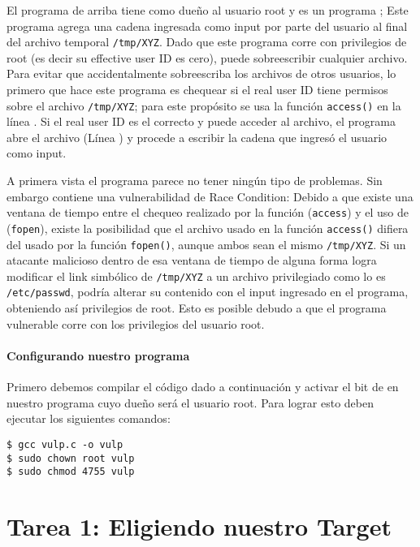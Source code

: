 El programa de arriba tiene como dueño al usuario root y es un programa \setuid; Este programa agrega una cadena ingresada como input por parte del usuario al final del archivo temporal {\tt /tmp/XYZ}. Dado que este programa corre con privilegios de root (es decir su effective user ID es cero), puede sobreescribir cualquier archivo. Para evitar que  accidentalmente sobreescriba los archivos de otros usuarios, lo primero que hace este programa es chequear si el real user ID tiene permisos sobre el archivo {\tt /tmp/XYZ}; para este propósito se usa la función {\tt access()} en la línea . Si el real user ID es el correcto y puede acceder al archivo, el programa abre el archivo (Línea ) y procede a escribir la cadena que ingresó el usuario como input.

A primera vista el programa parece no tener ningún tipo de problemas. Sin embargo contiene una vulnerabilidad de Race Condition: Debido a que existe una ventana de tiempo entre el chequeo realizado por la función ({\tt access}) y el uso de ({\tt fopen}), existe la posibilidad que el archivo usado en la función {\tt access()} difiera del usado por la función {\tt fopen()}, aunque ambos sean el mismo {\tt /tmp/XYZ}. Si un atacante malicioso dentro de esa ventana de tiempo de alguna forma logra modificar el link simbólico de {\tt /tmp/XYZ} a un archivo privilegiado como lo es \texttt{/etc/passwd}, podría alterar su contenido con el input ingresado en el programa, obteniendo así privilegios de root. Esto es posible debudo a que el programa vulnerable corre con los privilegios del usuario root.


\paragraph{Configurando nuestro programa \setuid}
Primero debemos compilar el código dado a continuación y activar el bit de \setuid en nuestro programa cuyo dueño será el usuario root.
Para lograr esto deben ejecutar los siguientes comandos:

\begin{lstlisting}
$ gcc vulp.c -o vulp
$ sudo chown root vulp
$ sudo chmod 4755 vulp
\end{lstlisting}



\section{Tarea 1: Eligiendo nuestro Target}

